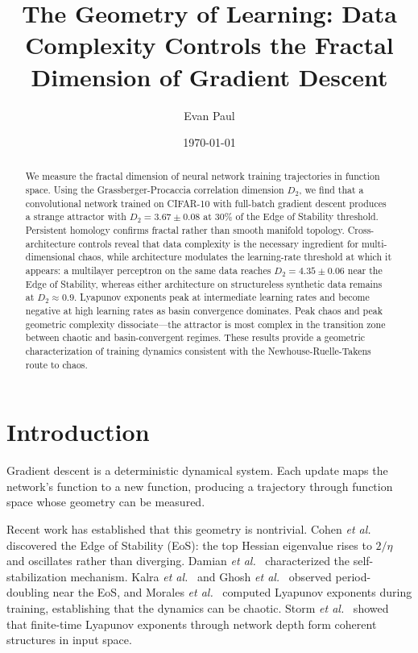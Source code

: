 \documentclass[aps,prl,twocolumn,superscriptaddress,floatfix]{revtex4-2}
\begin{document}
\title{The Geometry of Learning: Data Complexity Controls the Fractal Dimension of Gradient Descent}

\author{Evan Paul}

\date{\today}

\begin{abstract}
We measure the fractal dimension of neural network training trajectories in function space. Using the Grassberger-Procaccia correlation dimension $D_2$, we find that a convolutional network trained on CIFAR-10 with full-batch gradient descent produces a strange attractor with $D_2 = 3.67 \pm 0.08$ at 30\% of the Edge of Stability threshold. Persistent homology confirms fractal rather than smooth manifold topology. Cross-architecture controls reveal that data complexity is the necessary ingredient for multi-dimensional chaos, while architecture modulates the learning-rate threshold at which it appears: a multilayer perceptron on the same data reaches $D_2 = 4.35 \pm 0.06$ near the Edge of Stability, whereas either architecture on structureless synthetic data remains at $D_2 \approx 0.9$. Lyapunov exponents peak at intermediate learning rates and become negative at high learning rates as basin convergence dominates. Peak chaos and peak geometric complexity dissociate---the attractor is most complex in the transition zone between chaotic and basin-convergent regimes. These results provide a geometric characterization of training dynamics consistent with the Newhouse-Ruelle-Takens route to chaos.
\end{abstract}

\maketitle

\section{Introduction}

Gradient descent is a deterministic dynamical system. Each update maps the network's function to a new function, producing a trajectory through function space whose geometry can be measured.

Recent work has established that this geometry is nontrivial. Cohen \textit{et al.}~\cite{cohen2021} discovered the Edge of Stability (EoS): the top Hessian eigenvalue rises to $2/\eta$ and oscillates rather than diverging. Damian \textit{et al.}~\cite{damian2023} characterized the self-stabilization mechanism. Kalra \textit{et al.}~\cite{kalra2025} and Ghosh \textit{et al.}~\cite{ghosh2025} observed period-doubling near the EoS, and Morales \textit{et al.}~\cite{morales2024} computed Lyapunov exponents during training, establishing that the dynamics can be chaotic. Storm \textit{et al.}~\cite{storm2024} showed that finite-time Lyapunov exponents through network depth form coherent structures in input space.
\end{document}

